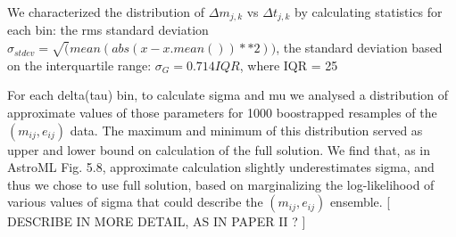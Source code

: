 \documentclass[fleqn,usenatbib]{mnras}  %
\begin{document}
We characterized the distribution of $\Delta m_{j,k}$  vs  $\Delta t_{j,k}$ by calculating statistics for each bin:  the rms standard deviation $\sigma_{stdev} = \sqrt(mean(abs(x - x.mean())**2))$, the standard deviation based on the interquartile range: $\sigma_{G} = 0.714 IQR $, where IQR = 25%

For   each delta(tau) bin, to calculate  sigma and mu we analysed a  distribution of approximate values of those parameters for  1000 boostrapped resamples of the $(m_{ij}, e_{ij})$ data.  The maximum and minimum  of this distribution served as upper and lower bound on calculation of the full solution.  We find that, as in AstroML Fig. 5.8, approximate calculation slightly underestimates sigma, and thus we chose to use full solution, based on marginalizing the log-likelihood of various values of sigma that could describe the $(m_{ij}, e_{ij})$ ensemble.  [ DESCRIBE IN MORE DETAIL, AS IN PAPER II ?  ] 





%



\bsp	%
\label{lastpage}
\end{document}
